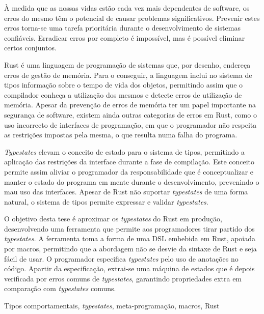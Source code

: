 
À medida que as nossas vidas estão cada vez mais dependentes de software,
os erros do mesmo têm o potencial de causar problemas significativos.
Prevenir estes erros torna-se uma tarefa prioritária durante o desenvolvimento de sistemas confiáveis.
Erradicar erros por completo é impossível, mas é possível eliminar certos conjuntos.

Rust é uma linguagem de programação de sistemas que, por desenho, endereça erros de gestão de memória.
Para o conseguir, a linguagem inclui no sistema de tipos informação sobre o tempo de vida dos objetos,
permitindo assim que o compilador conheça a utilização dos mesmos e detecte erros de utilização de memória.
Apesar da prevenção de erros de memória ter um papel importante na segurança de software,
existem ainda outras categorias de erros em Rust,
como o uso incorrecto de interfaces de programação, em que o programador não respeita as restrições impostas pela mesma, o que resulta numa falha do programa.

\emph{Typestates} elevam o conceito de estado para o sistema de tipos,
permitindo a aplicação das restrições da interface durante a fase de compilação.
Este conceito permite assim aliviar o programador da responsabilidade que é conceptualizar e manter o estado do programa em mente durante o desenvolvimento, prevenindo o mau uso das interfaces.
Apesar de Rust não suportar \emph{typestates} de uma forma natural,
o sistema de tipos permite expressar e validar \emph{typestates}.

O objetivo desta tese é aproximar os \emph{typestates} do Rust em produção,
desenvolvendo uma ferramenta que permite aos programadores tirar partido dos \emph{typestates}.
A ferramenta toma a forma de uma DSL embebida em Rust, apoiada por macros,
permitindo que a abordagem não se desvie da sintaxe de Rust e seja fácil de usar.
O programador especifica \emph{typestates} pelo uso de anotações no código.
Apartir da especificação, extrai-se uma máquina de estados que é depois verificada por erros comuns de \emph{typestates},
garantindo propriedades extra em comparação com \emph{typestates} comuns.

\begin{keywords}
Tipos comportamentais, \emph{typestates}, meta-programação, macros, Rust
\end{keywords}
